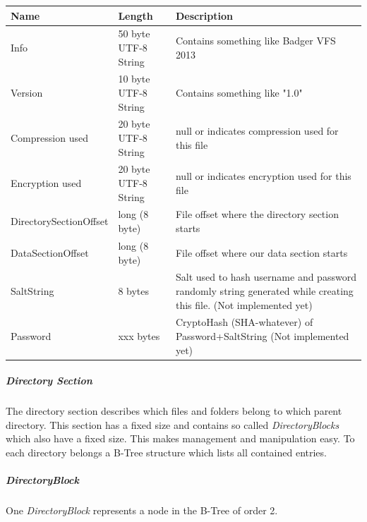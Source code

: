 \begin{tabular}{|l|l|p{5cm}|}
\hline
\textbf{Name} & \textbf{Length} & \textbf{Description}
\\  \hline
Info & 50 byte UTF-8 String & Contains something like Badger VFS 2013
\\ \hline
Version & 10 byte UTF-8 String & Contains something like "1.0"
\\ \hline
Compression used & 20 byte UTF-8 String & null or indicates compression used for this file
\\ \hline
Encryption used & 20 byte UTF-8 String & null or indicates encryption used for this file
\\ \hline
DirectorySectionOffset & long (8 byte) &  File offset where the directory
section starts \\ \hline
DataSectionOffset & long (8 byte) &  File offset where our data section starts
\\ \hline
 SaltString & 8 bytes  & Salt used to hash username and password randomly string generated while creating this
   file. (Not implemented yet)
 \\ \hline
  Password & xxx bytes  & CryptoHash (SHA-whatever) of Password+SaltString  (Not implemented yet)
\\ \hline

\end{tabular}


\subparagraph{Directory Section}
The directory section describes which files and folders belong to which parent
directory. This section has a fixed size and contains so called
\textit{DirectoryBlocks} which also have a fixed size. This makes management and
manipulation easy. To each directory belongs a B-Tree structure which lists all
contained entries.


\subparagraph*{DirectoryBlock}

One \textit{DirectoryBlock} represents a node in the B-Tree of order 2.

